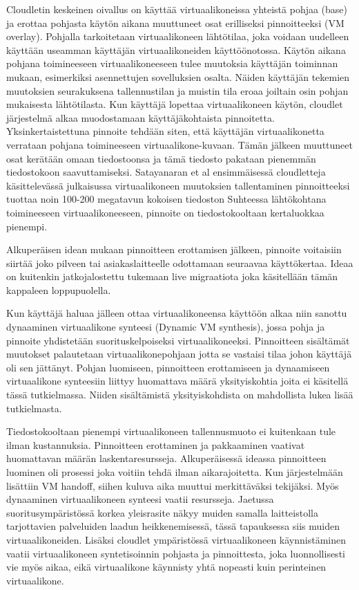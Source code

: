 Cloudletin keskeinen oivallus on käyttää virtuaalikoneissa yhteistä pohjaa (base) ja erottaa pohjasta käytön aikana muuttuneet osat erilliseksi pinnoitteeksi (VM overlay).
Pohjalla tarkoitetaan virtuaalikoneen lähtötilaa, joka voidaan uudelleen käyttään useamman käyttäjän virtuaalikoneiden käyttöönotossa.
Käytön aikana pohjana toimineeseen virtuaalikoneeseen tulee muutoksia käyttäjän toiminnan mukaan, esimerkiksi asennettujen sovelluksien osalta. 
Näiden käyttäjän tekemien muutoksien seurakuksena tallennustilan ja muistin tila eroaa joiltain osin pohjan mukaisesta lähtötilasta. 
Kun käyttäjä lopettaa virtuaalikoneen käytön, cloudlet järjestelmä alkaa muodostamaan käyttäjäkohtaista pinnoitetta. 
Yksinkertaistettuna pinnoite tehdään siten, että käyttäjän virtuaalikonetta verrataan pohjana toimineeseen virtuaalikone-kuvaan. Tämän jälkeen muuttuneet osat kerätään omaan tiedostoonsa ja tämä tiedosto pakataan pienemmän tiedostokoon saavuttamiseksi.
Satayanaran et al ensimmäisessä cloudletteja käsittelevässä julkaisussa \cite{satya09} virtuaalikoneen muutoksien tallentaminen pinnoitteeksi tuottaa noin 100-200 megatavun kokoisen tiedoston
Suhteessa lähtökohtana toimineeseen virtuaalikoneeseen, pinnoite on tiedostokooltaan kertaluokkaa pienempi. \cite{satya09}

Alkuperäisen idean mukaan pinnoitteen erottamisen jälkeen, pinnoite voitaisiin siirtää joko pilveen tai asiakaslaitteelle odottamaan seuraavaa käyttökertaa. Ideaa on kuitenkin jatkojalostettu tukemaan live migraatiota joka käsitellään tämän kappaleen loppupuolella.

Kun käyttäjä haluaa jälleen ottaa virtuaalikoneensa käyttöön alkaa niin sanottu dynaaminen virtuaalikone synteesi (Dynamic VM synthesis), jossa pohja ja pinnoite yhdistetään suorituskelpoiseksi virtuaalikoneeksi.
Pinnoitteen sisältämät muutokset palautetaan virtuaalikonepohjaan jotta se vastaisi tilaa johon käyttäjä oli sen jättänyt. Pohjan luomiseen, pinnoitteen erottamiseen ja dynaamiseen virtuaalikone synteesiin liittyy huomattava määrä yksityiskohtia joita ei käsitellä tässä tutkielmassa. Niiden sisältämistä yksityiskohdista on mahdollista lukea lisää \cite{ha2013just} tutkielmasta. 

Tiedostokooltaan pienempi virtuaalikoneen tallennusmuoto ei kuitenkaan tule ilman kustannuksia. Pinnoitteen erottaminen ja pakkaaminen vaativat huomattavan määrän laskentaresursseja. Alkuperäisessä ideassa pinnoitteen luominen oli prosessi joka voitiin tehdä ilman aikarajoitetta. Kun järjestelmään lisättiin VM handoff, siihen kuluva aika muuttui merkittäväksi tekijäksi. Myös dynaaminen virtuaalikoneen synteesi vaatii resursseja. Jaetussa suoritusympäristössä korkea yleisrasite näkyy muiden samalla laitteistolla tarjottavien palveluiden laadun heikkenemisessä, tässä tapauksessa siis muiden virtuaalikoneiden.
Lisäksi cloudlet ympäristössä virtuaalikoneen käynnistäminen vaatii virtuaalikoneen syntetisoinnin pohjasta ja pinnoittesta, joka luonnollisesti vie myös aikaa, eikä virtuaalikone käynnisty yhtä nopeasti kuin perinteinen virtuaalikone. 

